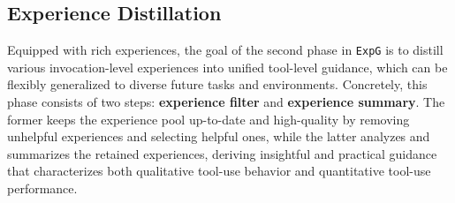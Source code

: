 \documentclass[11pt]{article}
\newcommand{\ours}{\texttt{ExpG}}
\begin{document}
\subsection{Experience Distillation}\label{sec:reuse}

Equipped with rich experiences, the goal of the second phase in {\ours} is to distill various invocation-level experiences into unified tool-level guidance, which can be flexibly generalized to diverse future tasks and environments. 
Concretely, this phase consists of two steps: \textbf{experience filter} and \textbf{experience summary}. The former keeps the experience pool up-to-date and high-quality by removing unhelpful experiences and selecting helpful ones, while the latter analyzes and summarizes the retained experiences, deriving insightful and practical guidance that characterizes both qualitative tool-use behavior and quantitative tool-use performance. 


\end{document}

